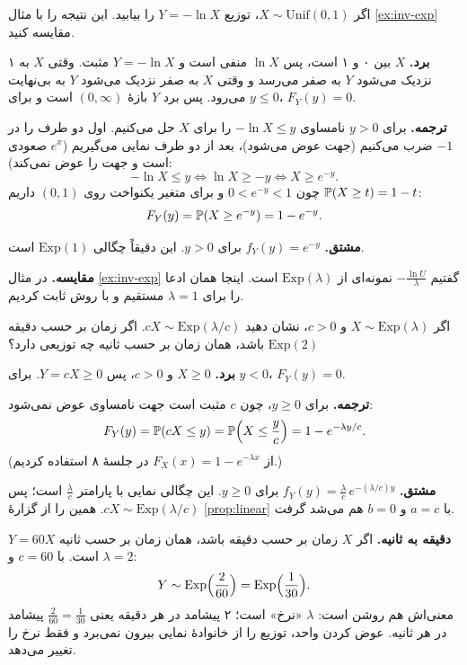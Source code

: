 \begin{exercise}
اگر $X\sim\mathrm{Unif}(0,1)$، توزیع $Y=-\ln X$ را بیابید. این نتیجه را با مثال \ref{ex:inv-exp} مقایسه کنید.
\begin{solution}
\textbf{برد.} $X$ بین ۰ و ۱ است، پس $\ln X$ منفی است و $Y=-\ln X$ مثبت. وقتی $X$ به ۱ نزدیک می‌شود $Y$ به صفر می‌رسد و وقتی $X$ به صفر نزدیک می‌شود $Y$ به بی‌نهایت می‌رود. پس برد $Y$ بازهٔ $(0,\infty)$ است و برای $y\le0$، $F_Y(y)=0$.

\textbf{ترجمه.} برای $y>0$ نامساوی $-\ln X\le y$ را برای $X$ حل می‌کنیم. اول دو طرف را در $-1$ ضرب می‌کنیم (جهت عوض می‌شود)، بعد از دو طرف نمایی می‌گیریم ($e^x$ صعودی است و جهت را عوض نمی‌کند):
\[ -\ln X\le y\iff \ln X\ge-y\iff X\ge e^{-y}. \]
چون $0<e^{-y}<1$ و برای متغیر یکنواخت روی $(0,1)$ داریم $\P(X\ge t)=1-t$:
\[ F_Y(y)=\P(X\ge e^{-y})=1-e^{-y}. \]

\textbf{مشتق.} $f_Y(y)=e^{-y}$ برای $y>0$. این دقیقاً چگالی $\mathrm{Exp}(1)$ است.

\textbf{مقایسه.} در مثال \ref{ex:inv-exp} گفتیم $-\frac{\ln U}{\lambda}$ نمونه‌ای از $\mathrm{Exp}(\lambda)$ است. اینجا همان ادعا را برای $\lambda=1$ مستقیم و با روش  ثابت کردیم.
\end{solution}
\end{exercise}

\begin{exercise}
اگر $X\sim\mathrm{Exp}(\lambda)$ و $c>0$، نشان دهید $cX\sim\mathrm{Exp}(\lambda/c)$. اگر زمان بر حسب دقیقه $\mathrm{Exp}(2)$ باشد، همان زمان بر حسب ثانیه چه توزیعی دارد؟
\begin{solution}
\textbf{برد.} $X\ge0$ و $c>0$، پس $Y=cX\ge0$. برای $y<0$، $F_Y(y)=0$.

\textbf{ترجمه.} برای $y\ge0$، چون $c$ مثبت است جهت نامساوی عوض نمی‌شود:
\[ F_Y(y)=\P(cX\le y)=\P\Bigl(X\le\frac yc\Bigr)=1-e^{-\lambda y/c}. \]
(از $F_X(x)=1-e^{-\lambda x}$ در جلسهٔ ۸ استفاده کردیم.)

\textbf{مشتق.} $f_Y(y)=\frac{\lambda}{c}\,e^{-(\lambda/c)y}$ برای $y\ge0$. این چگالی نمایی با پارامتر $\frac\lambda c$ است؛ پس $cX\sim\mathrm{Exp}(\lambda/c)$. همین را از گزارهٔ \ref{prop:linear} با $a=c$ و $b=0$ هم می‌شد گرفت.

\textbf{دقیقه به ثانیه.} اگر $X$ زمان بر حسب دقیقه باشد، همان زمان بر حسب ثانیه $Y=60X$ است. با $c=60$ و $\lambda=2$:
\[ Y\sim\mathrm{Exp}\Bigl(\frac{2}{60}\Bigr)=\mathrm{Exp}\Bigl(\frac1{30}\Bigr). \]
معنی‌اش هم روشن است: $\lambda$ «نرخ» است؛ ۲ پیشامد در هر دقیقه یعنی $\frac{2}{60}=\frac1{30}$ پیشامد در هر ثانیه. عوض کردن واحد، توزیع را از خانوادهٔ نمایی بیرون نمی‌برد و فقط نرخ را تغییر می‌دهد.
\end{solution}
\end{exercise}

